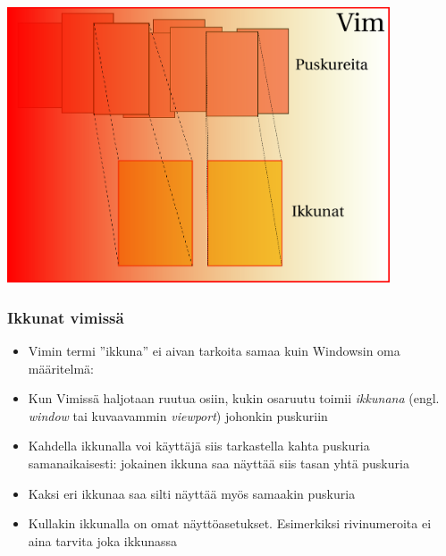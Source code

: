 \documentclass[]{beamer}
\begin{document}
\begin{frame}
    \includegraphics[width=0.85\textwidth]{puskurit_ikkunat}
\end{frame}

\begin{frame}
    \frametitle{Ikkunat vimissä}
    \begin{itemize}
        \item Vimin termi ''ikkuna'' ei aivan tarkoita samaa kuin Windowsin oma määritelmä:
        \item Kun Vimissä haljotaan ruutua osiin, kukin osaruutu toimii \emph{ikkunana} (engl. \emph{window} tai kuvaavammin \emph{viewport}) johonkin puskuriin
        \pause
        \item Kahdella ikkunalla voi käyttäjä siis tarkastella kahta puskuria samanaikaisesti: jokainen ikkuna saa näyttää siis tasan yhtä puskuria 
        \item Kaksi eri ikkunaa saa silti näyttää myös samaakin puskuria
        \item Kullakin ikkunalla on omat näyttöasetukset. Esimerkiksi rivinumeroita ei aina tarvita joka ikkunassa
    \end{itemize}
\end{frame}
\end{document}
